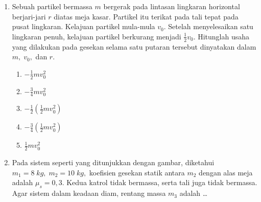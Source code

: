 \documentclass[A4,12PT, english, twocolumn]{journal}
\begin{document}
\begin{enumerate}
\item Sebuah partikel bermassa $m$ bergerak pada lintasan lingkaran horizontal berjari-jari $r$ diatas meja kasar. Partikel itu terikat pada tali tepat pada pusat lingkaran. Kelajuan partikel mula-mula $v_0$. Setelah menyelesaikan satu lingkaran penuh, kelajuan partikel berkurang menjadi $\frac{1}{2} v_0$. Hitunglah usaha yang dilakukan pada gesekan selama satu putaran tersebut dinyatakan dalam $m, \; v_0,$ dan $r.$
    \begin{enumerate}
        \item $- \frac{1}{2} mv_0^2$
        \item $- \frac{3}{4} mv_0^2$
        \item $-\frac{1}{2} \left(\frac{1}{2} mv_0^2 \right)$
        \item $-\frac{3}{4} \left(\frac{1}{2} mv_0^2 \right)$
        \item $\frac{1}{2} mv_0^2$
    \end{enumerate}
     
\item Pada sistem seperti yang ditunjukkan dengan gambar, diketahui $m_1 =8 \; kg, \; m_2=10 \; kg,$ koefisien gesekan statik antara $m_2$ dengan alas meja adalah $\mu_s = 0,3$. Kedua katrol tidak bermassa, serta tali juga tidak bermassa. Agar sistem dalam keadaan diam, rentang massa $m_3$ adalah \dots
\begin{center}
\end{center}
\end{enumerate}
\end{document}
